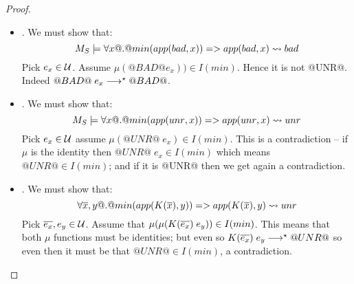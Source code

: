 \documentclass[preprint]{sigplanconf}
\begin{document}
\begin{proof}
\begin{itemize}
   \item {}. We must show that:
             \[ M_S \models \forall x @.@ min(app(\mathop{bad},x)) => app(\mathop{bad},x) \rightsquigarrow \mathop{bad}  \]
         Pick $e_x \in {\cal U}$. Assume $\mu(@BAD@ e_x)) \in I(min)$. Hence it is not @UNR@. Indeed
              $@BAD@\;e_x \longrightarrow^{\star} @BAD@$.
   \item {}. We must show that:
             \[ M_S \models \forall x @.@ min(app(\mathop{unr},x)) => app(\mathop{unr},x) \rightsquigarrow \mathop{unr} \]
         Pick $e_x \in {\cal U}$ assume $\mu(@UNR@\;e_x) \in I(min)$. This is a contradiction -- if $\mu$ is
         the identity then $@UNR@\;e_x \in I(min)$ which means $@UNR@ \in I(min)$; and if it is @UNR@ then
         we get again a contradiction.
   \item {}. We must show that:
             \[ \forall \overline{x},y @.@ min(app(K(\overline{x}),y)) => app(K(\overline{x}),y) \rightsquigarrow \mathop{unr}  \]
         Pick $\overline{e_x}, e_y \in {\cal U}$. Assume that $\mu(\mu(K(\overline{e_x})\;e_y)) \in I(min)$. This means that
         both $\mu$ functions must be identities; but even so $K(\overline{e_x})\;e_y \longrightarrow^{\star} @UNR@$ so even then 
         it must be that $@UNR@ \in I(min)$, a contradiction.
\end{itemize}
\end{proof}
\end{document}
